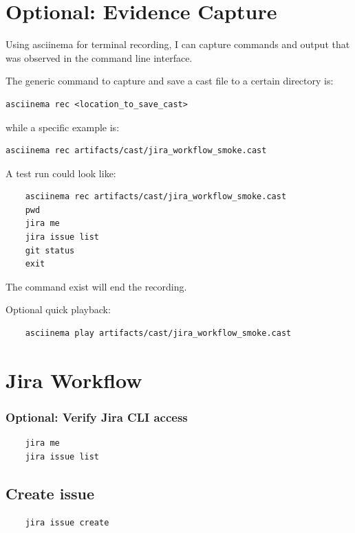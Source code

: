 \documentclass{article}
\begin{document}
 






\section{Optional: Evidence Capture}
Using asciinema for terminal recording, I can capture commands and output that was observed in the command line interface.

The generic command to capture and save a cast file to a certain directory is:

\begin{verbatim}
asciinema rec <location_to_save_cast>
\end{verbatim}

while a specific example is:\\

\begin{verbatim}
asciinema rec artifacts/cast/jira_workflow_smoke.cast

\end{verbatim}


A test run could look like: 
\begin{verbatim}
    asciinema rec artifacts/cast/jira_workflow_smoke.cast
    pwd
    jira me
    jira issue list
    git status
    exit
\end{verbatim}
The command exist will end the recording.


Optional quick playback:

\begin{verbatim}
    asciinema play artifacts/cast/jira_workflow_smoke.cast
\end{verbatim}
 

\section{Jira Workflow}

\subsubsection*{Optional: Verify Jira CLI access}


\begin{verbatim}
    jira me
    jira issue list
\end{verbatim}
 


\subsection{Create issue}
\begin{verbatim}
    jira issue create
\end{verbatim}
\end{document}
